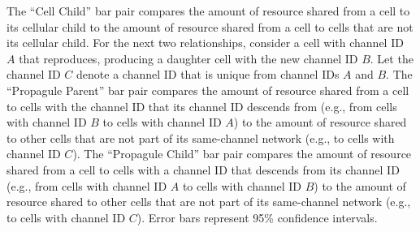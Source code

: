 \begin{sidewaysfigure*}
\begin{center}
{The ``Cell Child'' bar pair compares the amount of resource shared from a cell to its cellular child to the amount of resource shared from a cell to cells that are not its cellular child.
For the next two relationships, consider a cell with channel ID $A$ that reproduces, producing a daughter cell with the new channel ID $B$.
Let the channel ID $C$ denote a channel ID that is unique from channel IDs $A$ and $B$.
The ``Propagule Parent'' bar pair compares the amount of resource shared from a cell to cells with the channel ID that its channel ID descends from (e.g., from cells with channel ID $B$ to cells with channel ID $A$) to the amount of resource shared to other cells that are not part of its same-channel network (e.g., to cells with channel ID $C$).
The ``Propagule Child'' bar pair compares the amount of resource shared from a cell to cells with a channel ID that descends from its channel ID (e.g., from cells with channel ID $A$ to cells with channel ID $B$) to the amount of resource shared to other cells that are not part of its same-channel network (e.g., to cells with channel ID $C$).
Error bars represent 95\% confidence intervals.
}
\label{fig:resource_contributed_by_treat}
\end{center}
\end{sidewaysfigure*}
